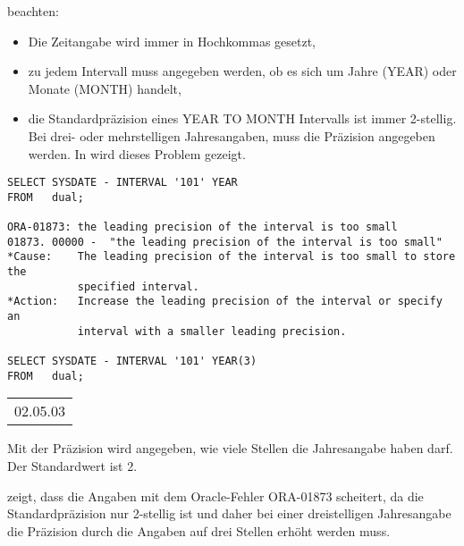            beachten:
          \begin{itemize}
            \item Die Zeitangabe wird immer in Hochkommas gesetzt,
            \item zu jedem Intervall muss angegeben werden, ob es sich um Jahre (YEAR) oder Monate (MONTH) handelt,
            \item die Standardpräzision eines YEAR TO MONTH Intervalls ist immer 2-stellig. Bei drei- oder mehrstelligen Jahresangaben, muss die Präzision angegeben werden. In  wird dieses Problem gezeigt.
          \end{itemize}
		  \clearpage
          \begin{lstlisting}[language=oracle_sql,caption={Richtiger Umgang mit YEAR TO MONTH Intervallen},label=sql03_20]
SELECT SYSDATE - INTERVAL '101' YEAR
FROM   dual;

ORA-01873: the leading precision of the interval is too small 
01873. 00000 -  "the leading precision of the interval is too small"
*Cause:    The leading precision of the interval is too small to store the
           specified interval.
*Action:   Increase the leading precision of the interval or specify an
           interval with a smaller leading precision.

SELECT SYSDATE - INTERVAL '101' YEAR(3)
FROM   dual;
          \end{lstlisting}
\clearpage
          \begin{center}
            \begin{small}
              \tablehead{}
              \begin{oraclesql}
                \begin{supertabular}{l}
                  02.05.03 \\
                \end{supertabular}
              \end{oraclesql}
            \end{small}
          \end{center}
          \begin{merke}
            Mit der Präzision wird angegeben, wie viele Stellen die
            Jahresangabe haben darf. Der Standardwert ist 2.
          \end{merke}
           zeigt, dass die Angaben  mit dem Oracle-Fehler ORA-01873 scheitert, da die
          Standardpräzision nur 2-stellig ist und daher bei einer
          dreistelligen Jahresangabe die Präzision durch die Angaben
           auf drei Stellen erhöht werden muss.

